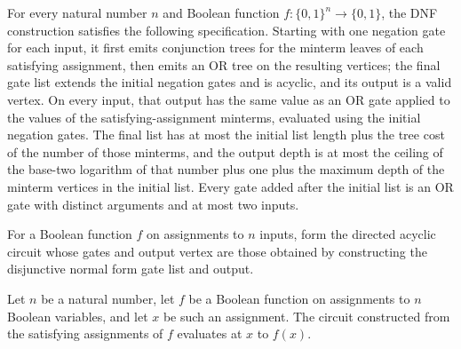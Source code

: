 \begin{theorem}
\label{BoolCircuit.dnf_spec}
\leanok
{}
For every natural number $n$ and Boolean function $f\colon\{0,1\}^n\to\{0,1\}$, the DNF
construction satisfies the following specification. Starting with one negation gate for
each input, it first emits conjunction trees for the minterm leaves of each satisfying
assignment, then emits an OR tree on the resulting vertices; the final gate list extends
the initial negation gates and is acyclic, and its output is a valid vertex. On every
input, that output has the same value as an OR gate applied to the values of the
satisfying-assignment minterms, evaluated using the initial negation gates. The final
list has at most the initial list length plus the tree cost of the number of those
minterms, and the output depth is at most the ceiling of the base-two logarithm of that
number plus one plus the maximum depth of the minterm vertices in the initial list.
Every gate added after the initial list is an OR gate with distinct arguments and at
most two inputs.
\end{theorem}

\begin{definition}
\label{BoolCircuit.dnfDAG}
\leanok
{}
For a Boolean function $f$ on assignments to $n$ inputs, form the directed acyclic
circuit whose gates and output vertex are those obtained by constructing the disjunctive
normal form gate list and output.
\end{definition}

\begin{theorem}
\label{BoolCircuit.dnfDAG_eval}
\leanok
{}
Let $n$ be a natural number, let $f$ be a Boolean function on assignments to $n$ Boolean
variables, and let $x$ be such an assignment. The circuit constructed from the
satisfying assignments of $f$ evaluates at $x$ to $f(x)$.
\end{theorem}

